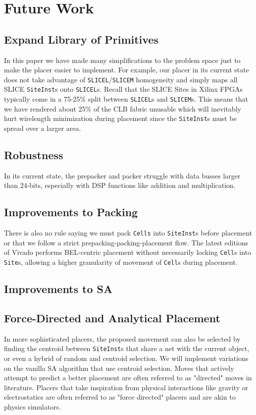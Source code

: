 \section{Future Work}

\subsection{Expand Library of Primitives}
In this paper we have made many simplifications to the problem space just to make the placer easier to implement.
For example, our placer in its current state does not take advantage of \texttt{SLICEL}/\texttt{SLICEM} homogeneity and simply maps all SLICE \texttt{SiteInst}s onto \texttt{SLICEL}s. 
Recall that the SLICE Sites in Xilinx FPGAs typically come in a 75-25\% split between \texttt{SLICEL}s and \texttt{SLICEM}s. 
This means that we have rendered about 25\% of the CLB fabric unusable which will inevitably hurt wirelength minimization during placement since the \texttt{SiteInst}s must be spread over a larger area. 

\subsection{Robustness}
In its current state, the prepacker and packer struggle with data busses larger than 24-bits, especially with DSP functions like addition and multiplication. 

\subsection{Improvements to Packing}
There is also no rule saying we must pack \texttt{Cells} into \texttt{SiteInst}s before placement or that we follow a strict prepacking-packing-placement flow. 
The latest editions of Vivado performs BEL-centric placement without necessarily locking \texttt{Cell}s into \texttt{Site}s, allowing a higher granularity of movement of \texttt{Cell}s during placement. 

\subsection{Improvements to SA}

\subsection{Force-Directed and Analytical Placement}

In more sophisticated placers, the proposed movement can also be selected by finding the centroid between \texttt{SiteInst}s that share a net with the current object, or even a hybrid of random and centroid selection. 
We will implement variations on the vanilla SA algorithm that use centroid selection. 
Moves that actively attempt to predict a better placement are often referred to as "directed" moves in literature. 
Placers that take inspiration from physical interactions like gravity or electrostatics are often referred to as "force directed" placers and are akin to physics simulators. 

